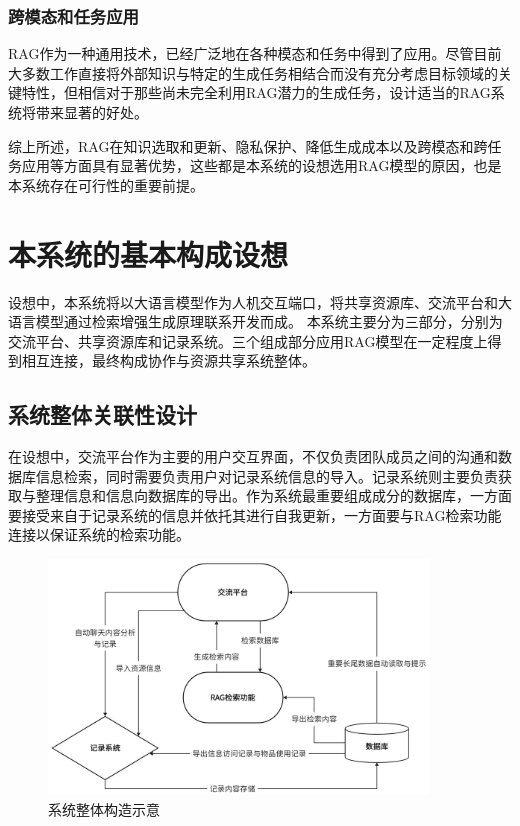 \documentclass[zihao=-4]{ctexart}
\begin{document}
\begin{spacing}{1.5}
 \subsubsection{跨模态和任务应用 }  RAG作为一种通用技术，已经广泛地在各种模态和任务中得到了应用。尽管目前大多数工作直接将外部知识与特定的生成任务相结合而没有充分考虑目标领域的关键特性，但相信对于那些尚未完全利用RAG潜力的生成任务，设计适当的RAG系统将带来显著的好处\cite{5}。

综上所述，RAG在知识选取和更新、隐私保护、降低生成成本以及跨模态和跨任务应用等方面具有显著优势，这些都是本系统的设想选用RAG模型的原因，也是本系统存在可行性的重要前提。
\section{本系统的基本构成设想}
  设想中，本系统将以大语言模型作为人机交互端口，将共享资源库、交流平台和大语言模型通过检索增强生成原理联系开发而成。
  本系统主要分为三部分，分别为交流平台、共享资源库和记录系统。三个组成部分应用RAG模型在一定程度上得到相互连接，最终构成协作与资源共享系统整体。
\subsection{系统整体关联性设计}
在设想中，交流平台作为主要的用户交互界面，不仅负责团队成员之间的沟通和数据库信息检索，同时需要负责用户对记录系统信息的导入。记录系统则主要负责获取与整理信息和信息向数据库的导出。作为系统最重要组成成分的数据库，一方面要接受来自于记录系统的信息并依托其进行自我更新，一方面要与RAG检索功能连接以保证系统的检索功能。
\begin{figure}[H] %
    \centering %
    \includegraphics[width=0.9\textwidth]{系统整体.jpg} %
    \caption{系统整体构造示意} %
    \label{example_label} %
\end{figure}

\end{spacing}
\end{document}
